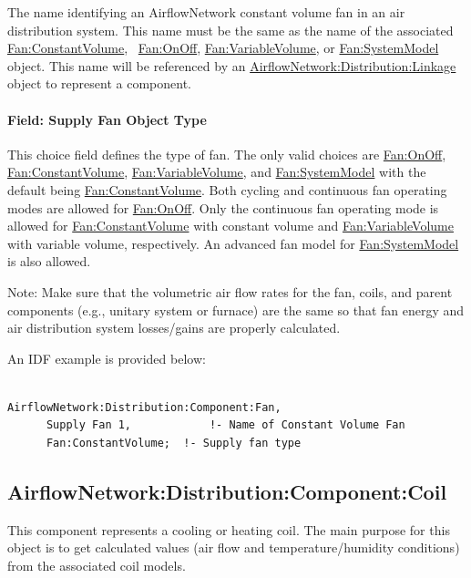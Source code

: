 The name identifying an AirflowNetwork constant volume fan in an air distribution system. This name must be the same as the name of the associated \hyperref[fanconstantvolume]{Fan:ConstantVolume},~ \hyperref[fanonoff]{Fan:OnOff}, \hyperref[fanvariablevolume]{Fan:VariableVolume}, or \hyperref[fansystemmodel]{Fan:SystemModel} object. This name will be referenced by an \hyperref[airflownetworkdistributionlinkage]{AirflowNetwork:Distribution:Linkage} object to represent a component.

\paragraph{Field: Supply Fan Object Type}\label{field-supply-fan-object-type}

This choice field defines the type of fan. The only valid choices are \hyperref[fanonoff]{Fan:OnOff},~ \hyperref[fanconstantvolume]{Fan:ConstantVolume}, \hyperref[fanvariablevolume]{Fan:VariableVolume}, and  \hyperref[fansystemmodel]{Fan:SystemModel} with the default being \hyperref[fanconstantvolume]{Fan:ConstantVolume}. Both cycling and continuous fan operating modes are allowed for \hyperref[fanonoff]{Fan:OnOff}. Only the continuous fan operating mode is allowed for \hyperref[fanconstantvolume]{Fan:ConstantVolume} with constant volume and \hyperref[fanvariablevolume]{Fan:VariableVolume} with variable volume, respectively. An advanced fan model for \hyperref[fansystemmodel]{Fan:SystemModel} is also allowed.

Note: Make sure that the volumetric air flow rates for the fan, coils, and parent components (e.g., unitary system or furnace) are the same so that fan energy and air distribution system losses/gains are properly calculated.

An IDF example is provided below:

\begin{lstlisting}

AirflowNetwork:Distribution:Component:Fan,
      Supply Fan 1,            !- Name of Constant Volume Fan
      Fan:ConstantVolume;  !- Supply fan type
\end{lstlisting}

\subsection{AirflowNetwork:Distribution:Component:Coil}\label{airflownetworkdistributioncomponentcoil}

This component represents a cooling or heating coil. The main purpose for this object is to get calculated values (air flow and temperature/humidity conditions) from the associated coil models.

